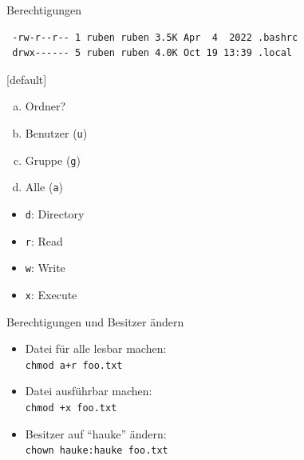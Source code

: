 \documentclass[compress]{beamer}
\begin{document}
\begin{frame}[fragile]{Berechtigungen}
    \vspace{-8mm}

\Huge
\begin{verbatim}
 -rw-r--r-- 1 ruben ruben 3.5K Apr  4  2022 .bashrc
 drwx------ 5 ruben ruben 4.0K Oct 19 13:39 .local
\end{verbatim}

\normalsize

\hspace*{3mm}

{
    [default]
    \begin{enumerate}[a)]
        \item Ordner?
        \item Benutzer (\texttt{u})
        \item Gruppe (\texttt{g})
        \item Alle (\texttt{a})
    \end{enumerate}
}

\begin{itemize}
\item \verb+d+: Directory
\item \verb+r+: Read
\item \verb+w+: Write
\item \verb+x+: Execute
\end{itemize}

\end{frame}

\begin{frame}[fragile]{Berechtigungen und Besitzer ändern}
\begin{itemize}
\item Datei für alle lesbar machen:\\
\verb|chmod a+r foo.txt|
\item Datei ausführbar machen:\\
\verb|chmod +x foo.txt|
\item Besitzer auf \enquote{hauke} ändern:\\
\verb+chown hauke:hauke foo.txt+
\end{itemize}
\end{frame}
\end{document}

